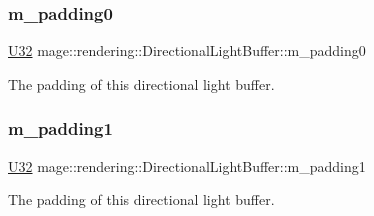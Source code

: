 \subsubsection{\texorpdfstring{m\+\_\+padding0}{m\_padding0}}
{\footnotesize\ttfamily \hyperlink{namespacemage_a41c104c036fba3756a74e19f793eeaa1}{U32} mage\+::rendering\+::\+Directional\+Light\+Buffer\+::m\+\_\+padding0}

The padding of this directional light buffer. \hypertarget{structmage_1_1rendering_1_1_directional_light_buffer_a9e86dcc4f68340eb64408cf638996a69}{}\label{structmage_1_1rendering_1_1_directional_light_buffer_a9e86dcc4f68340eb64408cf638996a69} 
\subsubsection{\texorpdfstring{m\+\_\+padding1}{m\_padding1}}
{\footnotesize\ttfamily \hyperlink{namespacemage_a41c104c036fba3756a74e19f793eeaa1}{U32} mage\+::rendering\+::\+Directional\+Light\+Buffer\+::m\+\_\+padding1}

The padding of this directional light buffer. 